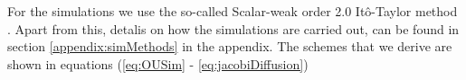 For the simulations we use the so-called Scalar-weak order 2.0 Itô-Taylor method \cite[algorithm 8.5]{Srkk2019}. Apart from this, detalis on how the simulations are carried out, can be found in section \ref{appendix:simMethods} in the appendix. The schemes that we derive are shown in equations (\ref{eq:OUSim} - \ref{eq:jacobiDiffusion})